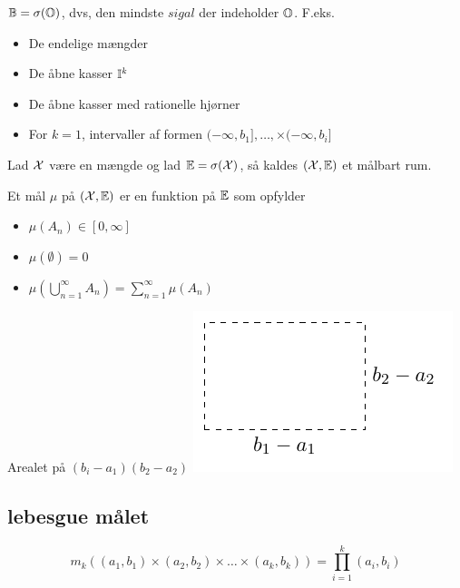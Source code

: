 \({\mathbb{B}}=\sigma({\mathbb{O}})\), dvs, den mindste \(sigal\) der indeholder \({\mathbb{O}}\). F.eks.
\begin{itemize}
  \item De endelige mængder
  \item De åbne kasser \({\mathbb{I}}^k\)
  \item De åbne kasser med rationelle hjørner
  \item For \(k=1\), intervaller af formen \((-\infty,b_1],\ldots,\times(-\infty,b_i] \)
\end{itemize}
Lad \({\mathcal{X}}\) være en mængde og lad \({\mathbb{E}}=\sigma({\mathcal{X}})\), så kaldes \(({\mathcal{X}},{\mathbb{E}})\) et målbart rum.
\begin{defn}
Et mål \(\mu\) på \(({\mathcal{X}},{\mathbb{E}})\) er en funktion på \({\mathbb{E}}\) som opfylder
\begin{itemize}
  \item \(\mu(A_n)\in[0,\infty]\)
  \item \(\mu(\emptyset)=0\)
  \item \(\mu\left(\bigcup_{n=1}^\infty A_n\right)=\sum_{n=1}^\infty \mu(A_n)\)
\end{itemize}
\end{defn}
\begin{exmp}
Arealet på \((b_i-a_1)(b_2-a_2)\)\tabularnewline
\includegraphics{fig/box.pdf}
\end{exmp}

\subsection{lebesgue målet} %
\label{sub:lebesgue_m_let}
\begin{defn}
\[
  m_k((a_1,b_1)\times(a_2,b_2)\times\ldots\times(a_k,b_k))=\prod_{i=1}^k(a_i,b_i)
\]
\end{defn}

